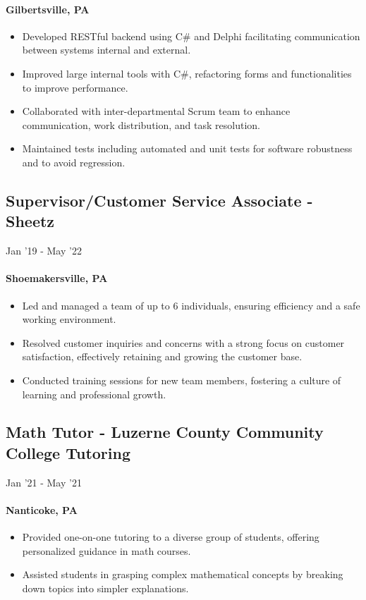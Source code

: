 \documentclass{article}
\begin{document}
\paragraph{Gilbertsville, PA}

\begin{itemize}
    \item Developed RESTful backend using C\# and Delphi facilitating communication between systems internal and external.
    \item Improved large internal tools with C\#, refactoring forms and functionalities to improve performance.
    \item Collaborated with inter-departmental Scrum team to enhance communication, work distribution, and task resolution.
    \item Maintained tests including automated and unit tests for software robustness and to avoid regression.
\end{itemize}

\subsection{Supervisor/Customer Service Associate - Sheetz} \hfill Jan '19 - May '22
\paragraph{Shoemakersville, PA}
\begin{itemize}
  \item Led and managed a team of up to 6 individuals, ensuring efficiency and a safe working environment.
  \item Resolved customer inquiries and concerns with a strong focus on customer satisfaction, effectively retaining and growing the customer base.
  \item Conducted training sessions for new team members, fostering a culture of learning and professional growth.
\end{itemize}

\subsection{Math Tutor - Luzerne County Community College Tutoring} \hfill Jan '21 - May '21
\paragraph{Nanticoke, PA}
\begin{itemize}
  \item Provided one-on-one tutoring to a diverse group of students, offering personalized guidance in math courses.
  \item Assisted students in grasping complex mathematical concepts by breaking down topics into simpler explanations.
\end{itemize}
\end{document}
